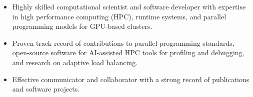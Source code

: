 
\fontfamily{\myResumeFont}\selectfont
\begin{itemize}[itemsep=-0em]
    \item Highly skilled computational scientist and software developer with expertise in high performance computing (HPC), runtime systems, and parallel programming models for GPU-based clusters. 
    \item Proven track record of contributions to parallel programming standards, open-source software for AI-assisted HPC tools for profiling and debugging, and research on adaptive load balancing. 
    \item Effective communicator and collaborator with a strong record of publications and software projects. 
\end{itemize}

